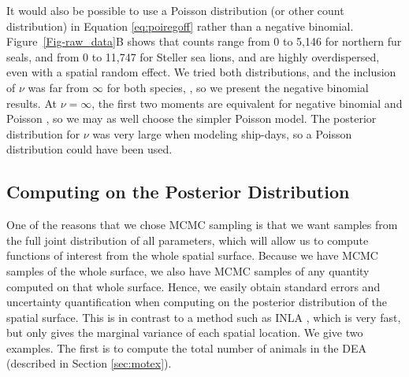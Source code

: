 \documentclass[11pt, titlepage]{article}
\begin{document}
\begin{spacing}{1.9}
\begin{flushleft}
It would also be possible to use a Poisson distribution (or other count distribution) in Equation \eqref{eq:poiregoff} rather than a negative binomial.  Figure~\ref{Fig-raw_data}B shows that counts range from 0 to 5,146 for northern fur seals, and from 0 to 11,747 for Steller sea lions, and are highly overdispersed, even with a spatial random effect.  We tried both distributions, and the inclusion of $\nu$ was far from $\infty$ for both species, , so we present the negative binomial results. At $\nu = \infty$, the first two moments are equivalent for negative binomial and Poisson \citep{VerHoefEtAl2007QuasiPoissonvsnegative2766}, so we may as well choose the simpler Poisson model.  The posterior distribution for $\nu$ was very large when modeling ship-days, so a Poisson distribution could have been used.


\subsection{Computing on the Posterior Distribution}

One of the reasons that we chose MCMC sampling is that we want samples from the full joint distribution of all parameters, which will allow us to compute functions of interest from the whole spatial surface.  Because we have MCMC samples of the whole surface, we also have MCMC samples of any quantity computed on that whole surface.  Hence, we easily obtain standard errors and uncertainty quantification when computing on the posterior distribution of the spatial surface.  This is in contrast to a method such as INLA \citep{rue_approximate_2009}, which is very fast, but only gives the marginal variance of each spatial location.  We give two examples.  The first is to compute the total number of animals in the DEA (described in Section \ref{sec:motex}).


\end{flushleft}
\end{spacing}
\end{document}
